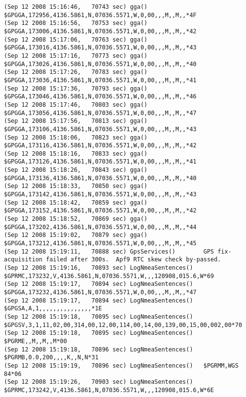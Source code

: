 {\begin{verbatim}
(Sep 12 2008 15:16:46,   70743 sec) gga()                $GPGGA,172956,4136.5861,N,07036.5571,W,0,00,,,M,,M,,*4F
(Sep 12 2008 15:16:56,   70753 sec) gga()                $GPGGA,173006,4136.5861,N,07036.5571,W,0,00,,,M,,M,,*42
(Sep 12 2008 15:17:06,   70763 sec) gga()                $GPGGA,173016,4136.5861,N,07036.5571,W,0,00,,,M,,M,,*43
(Sep 12 2008 15:17:16,   70773 sec) gga()                $GPGGA,173026,4136.5861,N,07036.5571,W,0,00,,,M,,M,,*40
(Sep 12 2008 15:17:26,   70783 sec) gga()                $GPGGA,173036,4136.5861,N,07036.5571,W,0,00,,,M,,M,,*41
(Sep 12 2008 15:17:36,   70793 sec) gga()                $GPGGA,173046,4136.5861,N,07036.5571,W,0,00,,,M,,M,,*46
(Sep 12 2008 15:17:46,   70803 sec) gga()                $GPGGA,173056,4136.5861,N,07036.5571,W,0,00,,,M,,M,,*47
(Sep 12 2008 15:17:56,   70813 sec) gga()                $GPGGA,173106,4136.5861,N,07036.5571,W,0,00,,,M,,M,,*43
(Sep 12 2008 15:18:06,   70823 sec) gga()                $GPGGA,173116,4136.5861,N,07036.5571,W,0,00,,,M,,M,,*42
(Sep 12 2008 15:18:16,   70833 sec) gga()                $GPGGA,173126,4136.5861,N,07036.5571,W,0,00,,,M,,M,,*41
(Sep 12 2008 15:18:26,   70843 sec) gga()                $GPGGA,173136,4136.5861,N,07036.5571,W,0,00,,,M,,M,,*40
(Sep 12 2008 15:18:33,   70850 sec) gga()                $GPGGA,173142,4136.5861,N,07036.5571,W,0,00,,,M,,M,,*43
(Sep 12 2008 15:18:42,   70859 sec) gga()                $GPGGA,173152,4136.5861,N,07036.5571,W,0,00,,,M,,M,,*42
(Sep 12 2008 15:18:52,   70869 sec) gga()                $GPGGA,173202,4136.5861,N,07036.5571,W,0,00,,,M,,M,,*44
(Sep 12 2008 15:19:02,   70879 sec) gga()                $GPGGA,173212,4136.5861,N,07036.5571,W,0,00,,,M,,M,,*45
(Sep 12 2008 15:19:11,   70888 sec) GpsServices()        GPS fix-acquisition failed after 300s.  Apf9 RTC skew check by-passed.
(Sep 12 2008 15:19:16,   70893 sec) LogNmeaSentences()   $GPRMC,173232,V,4136.5861,N,07036.5571,W,,,120908,015.6,W*69
(Sep 12 2008 15:19:17,   70894 sec) LogNmeaSentences()   $GPGGA,173232,4136.5861,N,07036.5571,W,0,00,,,M,,M,,*47
(Sep 12 2008 15:19:17,   70894 sec) LogNmeaSentences()   $GPGSA,A,1,,,,,,,,,,,,,,,*1E
(Sep 12 2008 15:19:18,   70895 sec) LogNmeaSentences()   $GPGSV,3,1,11,02,00,314,00,12,00,114,00,14,00,139,00,15,00,002,00*70
(Sep 12 2008 15:19:18,   70895 sec) LogNmeaSentences()   $PGRME,,M,,M,,M*00
(Sep 12 2008 15:19:18,   70896 sec) LogNmeaSentences()   $PGRMB,0.0,200,,,,K,,N,N*31
(Sep 12 2008 15:19:19,   70896 sec) LogNmeaSentences()   $PGRMM,WGS 84*06
(Sep 12 2008 15:19:26,   70903 sec) LogNmeaSentences()   $GPRMC,173242,V,4136.5861,N,07036.5571,W,,,120908,015.6,W*6E

\end{verbatim}}
